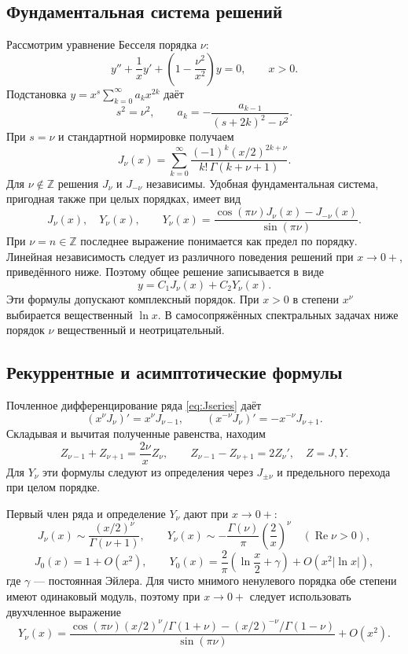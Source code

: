 \documentclass[12pt,a4paper]{article}
\DeclareMathOperator{\Rea}{Re}
\begin{document}
\subsection{Фундаментальная система решений}
Рассмотрим уравнение Бесселя порядка $\nu$:
\begin{equation}\label{eq:bessel}
y''+\frac1x y'+\left(1-\frac{\nu^2}{x^2}\right)y=0,\qquad x>0.
\end{equation}
Подстановка $y=x^s\sum_{k=0}^{\infty}a_kx^{2k}$ даёт
\[
s^2=\nu^2,\qquad
 a_k=-\frac{a_{k-1}}{(s+2k)^2-\nu^2}.
\]
При $s=\nu$ и стандартной нормировке получаем
\begin{equation}\label{eq:Jseries}
J_\nu(x)=\sum_{k=0}^{\infty}
\frac{(-1)^k(x/2)^{2k+\nu}}{k!\,\Gamma(k+\nu+1)}.
\end{equation}
Для $\nu\notin\mathbb Z$ решения $J_\nu$ и $J_{-\nu}$ независимы. Удобная фундаментальная система, пригодная также при целых порядках, имеет вид
\[
J_\nu(x),\quad Y_\nu(x),\qquad
Y_\nu(x)=\frac{\cos(\pi\nu)J_\nu(x)-J_{-\nu}(x)}{\sin(\pi\nu)}.
\]
При $\nu=n\in\mathbb Z$ последнее выражение понимается как предел по порядку. Линейная независимость следует из различного поведения решений при $x\to0+$, приведённого ниже. Поэтому общее решение записывается в виде
\[
y=C_1J_\nu(x)+C_2Y_\nu(x).
\]
Эти формулы допускают комплексный порядок. При $x>0$ в степени $x^\nu$ выбирается вещественный $\ln x$. В самосопряжённых спектральных задачах ниже порядок $\nu$ вещественный и неотрицательный.

\subsection{Рекуррентные и асимптотические формулы}
Почленное дифференцирование ряда \eqref{eq:Jseries} даёт
\[
(x^\nu J_\nu)'=x^\nu J_{\nu-1},\qquad
(x^{-\nu}J_\nu)'=-x^{-\nu}J_{\nu+1}.
\]
Складывая и вычитая полученные равенства, находим
\begin{equation}\label{eq:recB}
Z_{\nu-1}+Z_{\nu+1}=\frac{2\nu}{x}Z_\nu,\qquad
Z_{\nu-1}-Z_{\nu+1}=2Z_\nu',\quad Z=J,Y.
\end{equation}
Для $Y_\nu$ эти формулы следуют из определения через $J_{\pm\nu}$ и предельного перехода при целом порядке.

Первый член ряда и определение $Y_\nu$ дают при $x\to0+$:
\[
J_\nu(x)\sim\frac{(x/2)^\nu}{\Gamma(\nu+1)},\qquad
Y_\nu(x)\sim-\frac{\Gamma(\nu)}{\pi}\left(\frac2x\right)^\nu
\quad (\Rea\nu>0),
\]
\[
J_0(x)=1+O(x^2),\qquad
Y_0(x)=\frac2\pi\left(\ln\frac x2+\gamma\right)+O(x^2|\ln x|),
\]
где $\gamma$ --- постоянная Эйлера. Для чисто мнимого ненулевого порядка обе степени имеют одинаковый модуль, поэтому при $x\to0+$ следует использовать двухчленное выражение
\[
Y_\nu(x)=\frac{\cos(\pi\nu)(x/2)^\nu/\Gamma(1+\nu)
 -(x/2)^{-\nu}/\Gamma(1-\nu)}{\sin(\pi\nu)}+O(x^2).
\]
\end{document}
